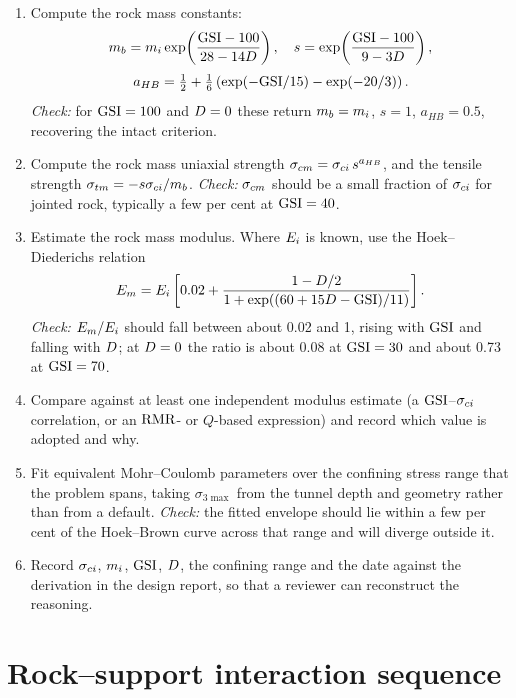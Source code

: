 \begin{enumerate}
  \item Compute the rock mass constants:
  \[
  m_b = m_i \exp\!\left(\frac{\mathrm{GSI}-100}{28-14D}\right),\quad
  s = \exp\!\left(\frac{\mathrm{GSI}-100}{9-3D}\right),
  \]
  \[
  a_{HB} = \tfrac{1}{2} + \tfrac{1}{6}\left(\exp(-\mathrm{GSI}/15)-\exp(-20/3)\right).
  \]
  \emph{Check:} for $\mathrm{GSI} = 100$ and $D = 0$ these return
  $m_b = m_i$, $s = 1$, $a_{HB} = 0.5$, recovering the intact criterion.

  \item Compute the rock mass uniaxial strength
  $\sigma_{cm} = \sigma_{ci}\,s^{a_{HB}}$, and the tensile strength
  $\sigma_{tm} = -s\sigma_{ci}/m_b$.
  \emph{Check:} $\sigma_{cm}$ should be a small fraction of $\sigma_{ci}$ for jointed rock,
  typically a few per cent at $\mathrm{GSI} = 40$.

  \item Estimate the rock mass modulus. Where $E_i$ is known, use the
  Hoek--Diederichs relation~\citep{hoekdiederichs2006}
  \[
  E_{m} = E_i\left[0.02 + \frac{1-D/2}
  {1+\exp\!\left((60+15D-\mathrm{GSI})/11\right)}\right].
  \]
  \emph{Check:} $E_{m}/E_i$ should fall between about 0.02 and 1, rising
  with $\mathrm{GSI}$ and falling with $D$; at $D = 0$ the ratio is about
  0.08 at $\mathrm{GSI} = 30$ and about 0.73 at $\mathrm{GSI} = 70$.

  \item Compare against at least one independent modulus estimate (a
  $\mathrm{GSI}$--$\sigma_{ci}$ correlation, or an $\mathrm{RMR}$- or $Q$-based expression) and
  record which value is adopted and why.

  \item Fit equivalent Mohr--Coulomb parameters over the confining stress
  range that the problem spans, taking
  $\sigma_{3\max}$ from the tunnel depth and geometry rather than from a
  default.
  \emph{Check:} the fitted envelope should lie within a few per cent of the
  Hoek--Brown curve across that range and will diverge outside it.

  \item Record $\sigma_{ci}$, $m_i$, $\mathrm{GSI}$, $D$, the confining range and the
  date against the derivation in the design report, so that a reviewer can
  reconstruct the reasoning.
\end{enumerate}

\section{Rock--support interaction sequence}
\label{sec:seq-support-interaction}

